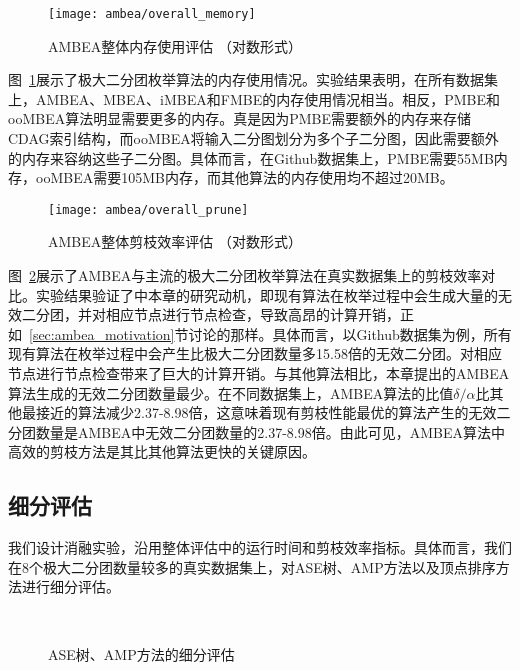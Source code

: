 \begin{figure} [H]
  \centering
  \texttt{[image: ambea/overall\_memory]}
  \caption{AMBEA整体内存使用评估 （对数形式）}
  \label{fig:ambea_overall_memory}
\end{figure}

图~\ref{fig:ambea_overall_memory}展示了极大二分团枚举算法的内存使用情况。实验结果表明，在所有数据集上，AMBEA、MBEA、iMBEA和FMBE的内存使用情况相当。相反，PMBE和ooMBEA算法明显需要更多的内存。真是因为PMBE需要额外的内存来存储CDAG索引结构，而ooMBEA将输入二分图划分为多个子二分图，因此需要额外的内存来容纳这些子二分图。具体而言，在Github数据集上，PMBE需要55MB内存，ooMBEA需要105MB内存，而其他算法的内存使用均不超过20MB。

\begin{figure} [H]
  \centering
  \texttt{[image: ambea/overall\_prune]}
  \caption{AMBEA整体剪枝效率评估 （对数形式）}
  \label{fig:ambea_overall_prune}
\end{figure}

图~\ref{fig:ambea_overall_prune}展示了AMBEA与主流的极大二分团枚举算法在真实数据集上的剪枝效率对比。实验结果验证了中本章的研究动机，即现有算法在枚举过程中会生成大量的无效二分团，并对相应节点进行节点检查，导致高昂的计算开销，正如~\ref{sec:ambea_motivation}节讨论的那样。具体而言，以Github数据集为例，所有现有算法在枚举过程中会产生比极大二分团数量多15.58倍的无效二分团。对相应节点进行节点检查带来了巨大的计算开销。与其他算法相比，本章提出的AMBEA算法生成的无效二分团数量最少。在不同数据集上，AMBEA算法的比值$\delta/\alpha$比其他最接近的算法减少2.37-8.98倍，这意味着现有剪枝性能最优的算法产生的无效二分团数量是AMBEA中无效二分团数量的2.37-8.98倍。由此可见，AMBEA算法中高效的剪枝方法是其比其他算法更快的关键原因。

\subsection{细分评估}

我们设计消融实验，沿用整体评估中的运行时间和剪枝效率指标。具体而言，我们在8个极大二分团数量较多的真实数据集上，对ASE树、AMP方法以及顶点排序方法进行细分评估。


\begin{figure} [H]
	\centering
  \vspace{0.05in}
  \\
  \vspace{0.05in}
	\caption{ASE树、AMP方法的细分评估}
	\label{fig:ambea_opt}
\end{figure}


